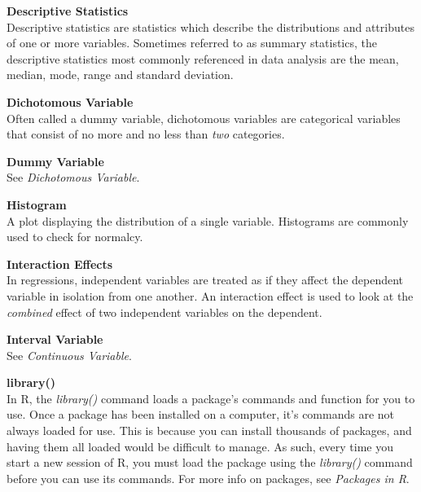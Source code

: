\documentclass[12pt,letterpaper]{article}
\begin{document}
\vspace{1em}

\textbf{Descriptive Statistics}\\
Descriptive statistics are statistics which describe the distributions and attributes of one or more variables. Sometimes referred to as summary statistics, the descriptive statistics most commonly referenced in data analysis are the mean, median, mode, range and standard deviation.

\vspace{1em}

\textbf{Dichotomous Variable}\\
Often called a dummy variable, dichotomous variables are categorical variables that consist of no more and no less than \emph{two} categories.

\vspace{1em}

\textbf{Dummy Variable}\\
See \textit{Dichotomous Variable}.

\vspace{1em}

\textbf{Histogram}\\
A plot displaying the distribution of a single variable. Histograms are commonly used to check for normalcy. 

\vspace{1em}

\textbf{Interaction Effects}\\
In regressions, independent variables are treated as if they affect the dependent variable in isolation from one another. An interaction effect is used to look at the \textit{combined} effect of two independent variables on the dependent.

\vspace{1em}

\textbf{Interval Variable}\\
See \textit{Continuous Variable}.

\vspace{1em}

\textbf{library()}\\
In R, the \textit{library()} command loads a package's commands and function for you to use. Once a package has been installed on a computer, it's commands are not always loaded for use. This is because you can install thousands of packages, and having them all loaded would be difficult to manage. As such, every time you start a new session of R, you must load the package using the \textit{library()} command before you can use its commands. For more info on packages, see \textit{Packages in R}.
\end{document}
